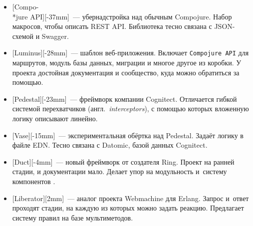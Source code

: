 \begin{itemize}


\item
  [Compo-\\*jure API][-37mm]~---
  убернадстройка над обычным Compojure. Набор макросов, чтобы описать REST
  API. Библиотека тесно связана с JSON-схемой и Swagger.


\item
  [Luminus][-28mm]~--- шаблон
  веб-приложения. Включает \verb|Compojure API| для маршрутов, модуль базы
  данных, миграции и многое другое из коробки. У проекта достойная документация
  и сообщество, куда можно обратиться за помощью.


\item
  [Pedestal][-23mm]~--- фреймворк
  компании Cognitect. Отличается гибкой системой перехватчиков
  (англ.~\emph{interceptors}), с помощью которых вложенную логику описывают
  линейно.


\item
  [Vase][-15mm]~---
  экспериментальная обёртка над Pedestal. Задаёт логику в файле
  EDN. Тесно связана с Datomic, базой данных Cognitect.


\item
  [Duct][-4mm]~--- новый
  фреймворк от создателя Ring. Проект на ранней стадии, и документации
  мало. Делает упор на модульность и~систему компонентов .


\item
  [Liberator][2mm]~---
  аналог проекта Webmachine для Erlang. Запрос и~ответ проходят стадии, на
  каждую из которых можно задать реакцию. Предлагает систему правил на базе
  мультиметодов.

\end{itemize}

